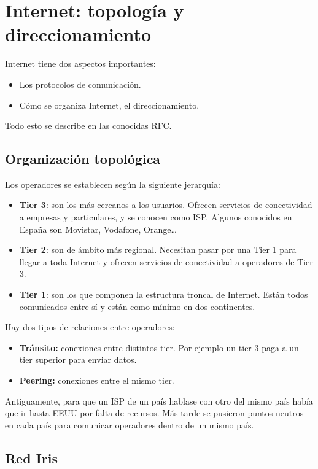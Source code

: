 \section{Internet: topología y direccionamiento}
Internet tiene dos aspectos importantes:
\begin{itemize}
    \item Los protocolos de comunicación.
    \item Cómo se organiza Internet, el direccionamiento.
\end{itemize}
Todo esto se describe en las conocidas \acrfull{RFC}.

\subsection{Organización topológica}

Los operadores se establecen según la siguiente jerarquía:
\begin{itemize}
    \item \textbf{Tier 3}: son los más cercanos a los usuarios. Ofrecen servicios de conectividad a empresas y particulares, y se conocen como \acrfull{ISP}. Algunos conocidos en España son Movistar, Vodafone, Orange\ldots
    \item \textbf{Tier 2}: son de ámbito más regional. Necesitan pasar por una Tier 1 para llegar a toda Internet y ofrecen servicios de conectividad a operadores de Tier 3.
    \item \textbf{Tier 1}: son los que componen la estructura troncal de Internet. Están todos comunicados entre sí y están como mínimo en dos continentes. 
\end{itemize}

Hay dos tipos de relaciones entre operadores:
\begin{itemize}
    \item \textbf{Tránsito:} conexiones entre distintos tier. Por ejemplo un tier 3 paga a un tier superior para enviar datos. 
    \item \textbf{Peering:} conexiones entre el mismo tier. 
\end{itemize}

Antiguamente, para que un \acrshort{ISP} de un país hablase con otro del mismo país había que ir hasta EEUU por falta de recursos. Más tarde se pusieron puntos neutros en cada país para comunicar operadores dentro de un mismo país.

\subsection{Red Iris}


